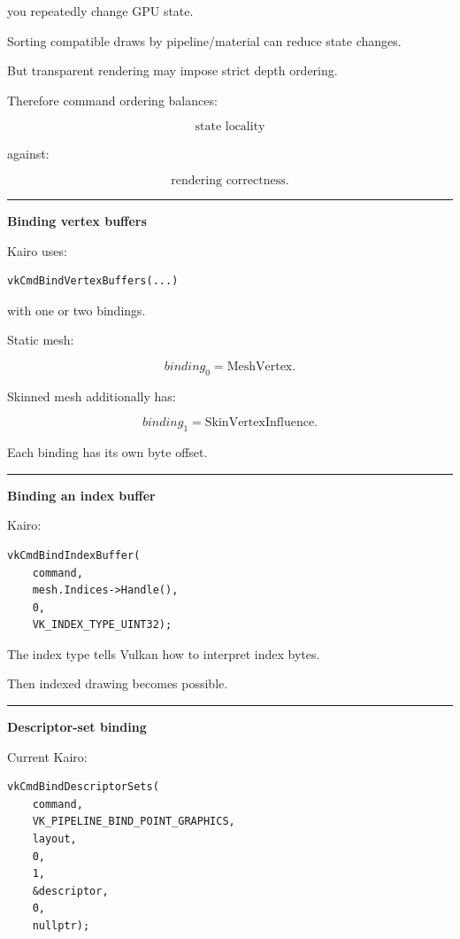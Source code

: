you repeatedly change GPU state.

Sorting compatible draws by pipeline/material can reduce state changes.

But transparent rendering may impose strict depth ordering.

Therefore command ordering balances:

\[
\boxed{
\text{state locality}
}
\]

against:

\[
\boxed{
\text{rendering correctness}.
}
\]

\begin{center}\rule{0.5\linewidth}{0.5pt}\end{center}

\textbf{Binding vertex buffers}

Kairo uses:

\begin{verbatim}
vkCmdBindVertexBuffers(...)
\end{verbatim}

with one or two bindings.

Static mesh:

\[
binding_0=\text{MeshVertex}.
\]

Skinned mesh additionally has:

\[
binding_1=\text{SkinVertexInfluence}.
\]

Each binding has its own byte offset.

\begin{center}\rule{0.5\linewidth}{0.5pt}\end{center}

\textbf{Binding an index buffer}

Kairo:

\begin{verbatim}
vkCmdBindIndexBuffer(
    command,
    mesh.Indices->Handle(),
    0,
    VK_INDEX_TYPE_UINT32);
\end{verbatim}

The index type tells Vulkan how to interpret index bytes.

Then indexed drawing becomes possible.

\begin{center}\rule{0.5\linewidth}{0.5pt}\end{center}

\textbf{Descriptor-set binding}

Current Kairo:

\begin{verbatim}
vkCmdBindDescriptorSets(
    command,
    VK_PIPELINE_BIND_POINT_GRAPHICS,
    layout,
    0,
    1,
    &descriptor,
    0,
    nullptr);
\end{verbatim}

